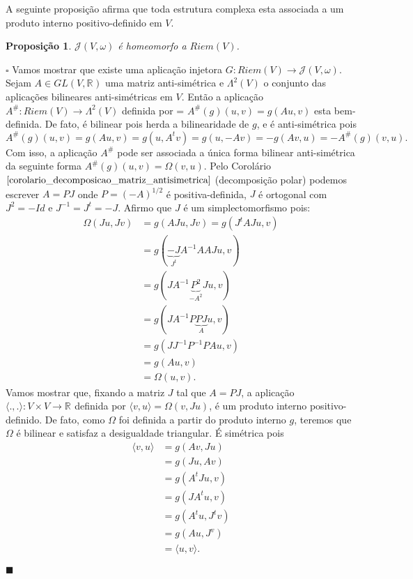 \documentclass[12pt]{book}
\newtheorem{proposicao}[teorema]{Proposição}
\newenvironment{prova}[1]{$\square$ #1}{\hfill$\blacksquare$}
\newcommand{\estruturascomplexaspadrao}{\mathcal{J}(V, \omega)}
\newcommand{\generalgroup}[2]{GL(#1, #2)}
\newcommand{\generalgroupreal}[1]{\generalgroup{#1}{\real{}}}
\newcommand{\produtointerno}[2]{\langle #1, #2 \rangle}
\newcommand{\produtointernoabrev}{\langle ., .\rangle}
\newcommand{\produtosinternos}[1]{Riem(#1)}
\newcommand{\real}[1]{\mathbb{R}^{#1}}
\newcommand{\reta}{\real{}}
\begin{document}
	A seguinte proposição afirma que toda estrutura complexa esta associada a um produto interno positivo-definido em $V$.
	\begin{proposicao}
		$\estruturascomplexaspadrao$ é homeomorfo a $\produtosinternos{V}$.
	\end{proposicao}
	\begin{prova}
		Vamos mostrar que existe uma aplicação injetora $G: \produtosinternos{V} \to \estruturascomplexaspadrao$. Sejam $A \in \generalgroupreal{V}$ uma matriz anti-simétrica e $\Lambda^{2}(V)$ o conjunto das aplicações bilineares anti-simétricas em $V$. Então a aplicação $A^{\#} : \produtosinternos{V} \to \Lambda^{2}(V)$ definida por = $A^{\#}(g)(u, v) = g(Au,v)$ esta bem-definida. De fato, é bilinear pois herda a bilinearidade de $g$, e é anti-simétrica pois
		$$
		A^{\#}(g)(u, v)=g(Au,v) = g(u,A^{t}v) = g(u,-Av) = -g(Av,u) = -A^{\#}(g)(v,u).
		$$
		Com isso, a aplicação $A^{\#}$ pode ser associada a única forma bilinear anti-simétrica da seguinte forma $A^{\#}(g)(u, v) = \Omega(v,u)$. Pelo Corolário $\ref{corolario_decomposicao_matriz_antisimetrica}$ (decomposição polar) podemos escrever $A = PJ$ onde $P = (-A)^{1/2}$ é positiva-definida,  $J$ é ortogonal com $J^{2} = -Id$ e $J^{-1}=J^{t} = -J$. Afirmo que $J$ é um simplectomorfismo pois:
		$$
		\begin{aligned}
		\Omega(Ju,Jv) &= g(AJu, Jv)= g(J^{t}AJu, v)
		\\
		&=g(\underbrace{-J}_{J^{t}}A^{-1}AAJu, v) 
		\\
		&= g(JA^{-1}\underbrace{P^{2}}_{-A^{2}}Ju, v)
		\\
		&=g(JA^{-1}P\underbrace{PJ}_{A}u, v)
		\\
		&=g(JJ^{-1}P^{-1}PAu, v) 
		\\
		&= g(Au, v)
		\\
		&=\Omega(u,v).
		\end{aligned}
		$$
		Vamos mostrar que, fixando a matriz $J$ tal que $A=PJ$, a aplicação $\produtointernoabrev :V \times V \to \reta$ definida por $\produtointerno{v}{u} = \Omega(v,Ju)$, é um produto interno positivo-definido. De fato, como $\Omega$ foi definida a partir do produto interno $g$, teremos que $\Omega$ é bilinear e satisfaz a desigualdade triangular. É simétrica pois 
		$$
		\begin{aligned}
		\produtointerno{v}{u} 
		&= g(Av,Ju) 
		\\
		&=g(Ju,Av)
		\\
		&=g(A^{t}Ju,v) 
		\\
		&=g(JA^{t}u,v)
		\\
		&= g(A^{t}u, J^{t}v)
		\\
		& = g(Au, J^v)
		\\
		&= \produtointerno{u}{v}.
		\end{aligned}
		$$
		

\end{prova}
\end{document}
